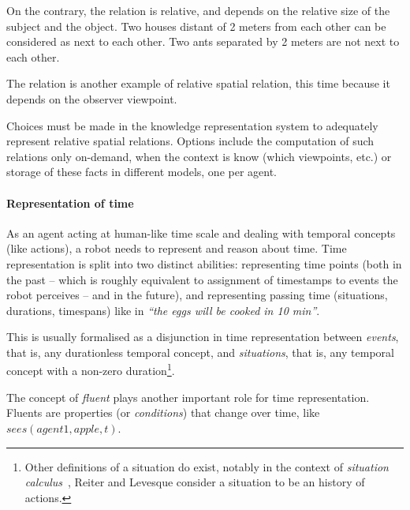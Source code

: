 On the contrary, the relation  is relative, and depends on the
relative size of the subject and the object. Two houses distant of 2 meters
from each other can be considered as next to each other. Two ants separated by
2 meters are not next to each other.

The relation  is another example of relative spatial relation,
this time because it depends on the observer viewpoint.


Choices must be made in the knowledge representation system to adequately
represent relative spatial relations. Options include the computation of such
relations only on-demand, when the context is know (which viewpoints, etc.) or
storage of these facts in different models, one per agent.


\paragraph{Representation of time}
\label{sect|time-representation}

As an agent acting at human-like time scale and dealing with temporal concepts
(like actions), a robot needs to represent and reason about
time. Time representation is split into two distinct abilities: representing
time points (both in the past -- which is roughly equivalent to assignment of
timestamps to events the robot perceives -- and in the future), and
representing passing time (situations, durations, timespans) like in
\emph{``the eggs will be cooked in 10 min''}.

This is usually formalised as a disjunction in time representation between
\emph{events}, that is, any durationless temporal concept, and
\emph{situations}, that is, any temporal concept with a non-zero
duration\footnote{Other definitions of a situation do exist, notably in the
context of \emph{situation calculus}~\cite{Levesque1998}, Reiter and Levesque
consider a situation to be an history of actions.}.


The concept of \emph{fluent} plays another important role for time
representation. Fluents are properties (or \emph{conditions}) that change over
time, like $sees(agent1, apple, t)$.

